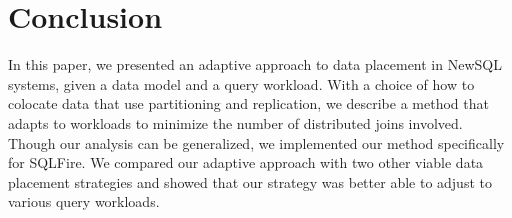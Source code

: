 \section{Conclusion}
\label{sec:conclusion}
In this paper, we presented an adaptive approach to data placement in NewSQL systems, given a data model and a query workload. With a choice of how to colocate data that use partitioning and replication, we describe a method that adapts to workloads to minimize the number of distributed joins involved. Though our analysis can be generalized, we implemented our method specifically for SQLFire. We compared our adaptive approach with two other viable data placement strategies and showed that our strategy was better able to adjust to various query workloads. 